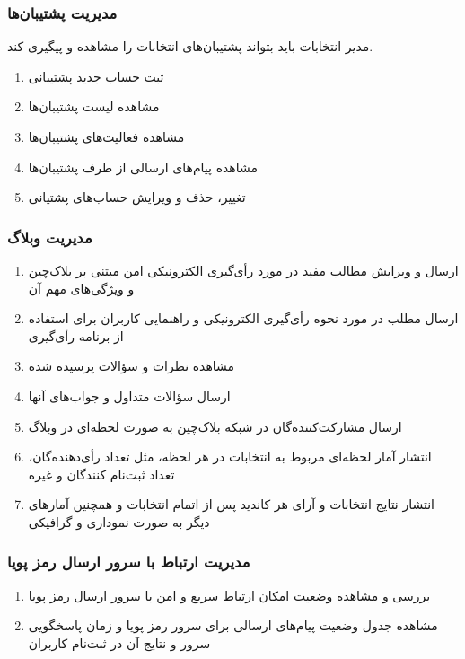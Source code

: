 \documentclass[12pt]{article}
\begin{document}
\subsubsection{مدیریت پشتیبان‌ها}
مدیر انتخابات باید بتواند پشتیبان‌های انتخابات را مشاهده و پیگیری کند. 
\begin{enumerate}[label=(\arabic*)]
\item
ثبت حساب جدید پشتیبانی
\item
مشاهده لیست پشتیبان‌ها
\item
مشاهده فعالیت‌های پشتیبان‌ها
\item
مشاهده پیام‌های ارسالی از طرف پشتیبان‌ها
\item
تغییر، حذف و ویرایش حساب‌های پشتیانی
\end{enumerate}



\subsubsection{مدیریت وبلاگ}
\begin{enumerate}[label=(\arabic*)]
\item
ارسال و ویرایش مطالب مفید در مورد رأی‌گیری الکترونیکی امن مبتنی بر بلاک‌چین و ویژگی‌های مهم آن
\item
ارسال مطلب در مورد نحوه رأی‌گیری الکترونیکی و راهنمایی کاربران برای استفاده از برنامه رأی‌گیری
\item
مشاهده نظرات و سؤالات پرسیده شده
\item
ارسال سؤالات متداول و جواب‌های آنها
\item
ارسال مشارکت‌کننده‌گان در شبکه بلاک‌چین به صورت لحظه‌ای در وبلاگ
\item
انتشار آمار لحظه‌ای مربوط به انتخابات در هر لحظه، مثل تعداد رأی‌دهنده‌گان، تعداد ثبت‌نام کنند‌گان و غیره
\item
انتشار نتایج انتخابات و آرای هر کاندید پس از اتمام انتخابات و همچنین آمارهای دیگر به صورت نموداری و گرافیکی
\end{enumerate}


\subsubsection{مدیریت ارتباط با سرور ارسال رمز پویا}
\begin{enumerate}[label=(\arabic*)]
\item
بررسی و مشاهده وضعیت امکان ارتباط سریع و امن با سرور ارسال رمز پویا
\item
مشاهده جدول وضعیت پیام‌های ارسالی برای سرور رمز پویا و زمان پاسخگویی سرور و نتایج آن در ثبت‌نام کاربران
\end{enumerate}
\end{document}
